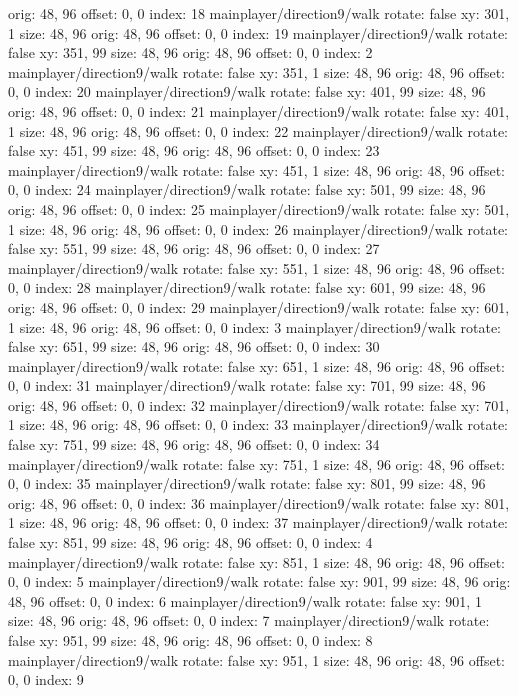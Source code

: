   orig: 48, 96
  offset: 0, 0
  index: 18
mainplayer/direction9/walk
  rotate: false
  xy: 301, 1
  size: 48, 96
  orig: 48, 96
  offset: 0, 0
  index: 19
mainplayer/direction9/walk
  rotate: false
  xy: 351, 99
  size: 48, 96
  orig: 48, 96
  offset: 0, 0
  index: 2
mainplayer/direction9/walk
  rotate: false
  xy: 351, 1
  size: 48, 96
  orig: 48, 96
  offset: 0, 0
  index: 20
mainplayer/direction9/walk
  rotate: false
  xy: 401, 99
  size: 48, 96
  orig: 48, 96
  offset: 0, 0
  index: 21
mainplayer/direction9/walk
  rotate: false
  xy: 401, 1
  size: 48, 96
  orig: 48, 96
  offset: 0, 0
  index: 22
mainplayer/direction9/walk
  rotate: false
  xy: 451, 99
  size: 48, 96
  orig: 48, 96
  offset: 0, 0
  index: 23
mainplayer/direction9/walk
  rotate: false
  xy: 451, 1
  size: 48, 96
  orig: 48, 96
  offset: 0, 0
  index: 24
mainplayer/direction9/walk
  rotate: false
  xy: 501, 99
  size: 48, 96
  orig: 48, 96
  offset: 0, 0
  index: 25
mainplayer/direction9/walk
  rotate: false
  xy: 501, 1
  size: 48, 96
  orig: 48, 96
  offset: 0, 0
  index: 26
mainplayer/direction9/walk
  rotate: false
  xy: 551, 99
  size: 48, 96
  orig: 48, 96
  offset: 0, 0
  index: 27
mainplayer/direction9/walk
  rotate: false
  xy: 551, 1
  size: 48, 96
  orig: 48, 96
  offset: 0, 0
  index: 28
mainplayer/direction9/walk
  rotate: false
  xy: 601, 99
  size: 48, 96
  orig: 48, 96
  offset: 0, 0
  index: 29
mainplayer/direction9/walk
  rotate: false
  xy: 601, 1
  size: 48, 96
  orig: 48, 96
  offset: 0, 0
  index: 3
mainplayer/direction9/walk
  rotate: false
  xy: 651, 99
  size: 48, 96
  orig: 48, 96
  offset: 0, 0
  index: 30
mainplayer/direction9/walk
  rotate: false
  xy: 651, 1
  size: 48, 96
  orig: 48, 96
  offset: 0, 0
  index: 31
mainplayer/direction9/walk
  rotate: false
  xy: 701, 99
  size: 48, 96
  orig: 48, 96
  offset: 0, 0
  index: 32
mainplayer/direction9/walk
  rotate: false
  xy: 701, 1
  size: 48, 96
  orig: 48, 96
  offset: 0, 0
  index: 33
mainplayer/direction9/walk
  rotate: false
  xy: 751, 99
  size: 48, 96
  orig: 48, 96
  offset: 0, 0
  index: 34
mainplayer/direction9/walk
  rotate: false
  xy: 751, 1
  size: 48, 96
  orig: 48, 96
  offset: 0, 0
  index: 35
mainplayer/direction9/walk
  rotate: false
  xy: 801, 99
  size: 48, 96
  orig: 48, 96
  offset: 0, 0
  index: 36
mainplayer/direction9/walk
  rotate: false
  xy: 801, 1
  size: 48, 96
  orig: 48, 96
  offset: 0, 0
  index: 37
mainplayer/direction9/walk
  rotate: false
  xy: 851, 99
  size: 48, 96
  orig: 48, 96
  offset: 0, 0
  index: 4
mainplayer/direction9/walk
  rotate: false
  xy: 851, 1
  size: 48, 96
  orig: 48, 96
  offset: 0, 0
  index: 5
mainplayer/direction9/walk
  rotate: false
  xy: 901, 99
  size: 48, 96
  orig: 48, 96
  offset: 0, 0
  index: 6
mainplayer/direction9/walk
  rotate: false
  xy: 901, 1
  size: 48, 96
  orig: 48, 96
  offset: 0, 0
  index: 7
mainplayer/direction9/walk
  rotate: false
  xy: 951, 99
  size: 48, 96
  orig: 48, 96
  offset: 0, 0
  index: 8
mainplayer/direction9/walk
  rotate: false
  xy: 951, 1
  size: 48, 96
  orig: 48, 96
  offset: 0, 0
  index: 9

